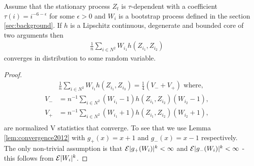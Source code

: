 \begin{lemma}
\label{lem:oneWtrick}
Assume that the stationary process $Z_t$ is $\tau$-dependent with a coefficient $\tau(i) = i^{-6-\epsilon}$ for some $\epsilon>0$ and $W_i$ is a bootstrap process defined in the section \ref{sec:background}. If $h$ is a Lipschitz continuous, degenerate and bounded core of two arguments then 
\begin{align}
\frac{1}{n} \sum_{i \in N^2} W_{i_1} h(Z_{i_1},Z_{i_2}) 
\end{align}
converges in distribution to some random variable.
\end{lemma}
\begin{proof}
\begin{align}
& \frac{1}{n} \sum_{i \in N^2} W_{i_1}  h(Z_{i_1},Z_{i_3}) = \frac 1 4 (V_{-} + V_{+}) \text{ where,} \\   
V_{-} &= n^{-1} \sum_{i \in N^2} (W_{i_1}-1)h(Z_{i_1},Z_{i_2})(W_{i_2}-1), \\
V_{+} &= n^{-1} \sum_{i \in N^2}  (W_{i_1}+1)h(Z_{i_1},Z_{i_2})(W_{i_2}+1), \\ 
\end{align}
are normalized V statistics that converge. To see that we use Lemma \ref{lem:convergence2012} with $g_{+}(x)=x+1$ and $g_{-}(x)=x-1$ respectively. The only non-trivial assumption is that $\mathcal{E}|g_{+}(W_i)|^k < \infty$ and $\mathcal{E}|g_{-}(W_i)|^k<\infty$  - this follows from $\mathcal{E} |W_i|^k$. 
\end{proof}




